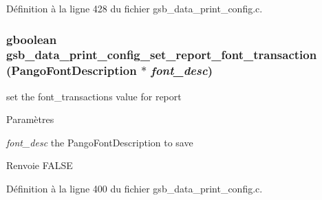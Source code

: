 Définition à la ligne 428 du fichier gsb\_\-data\_\-print\_\-config.c.

\subsubsection[{gsb\_\-data\_\-print\_\-config\_\-set\_\-report\_\-font\_\-transaction}]{\setlength{\rightskip}{0pt plus 5cm}gboolean gsb\_\-data\_\-print\_\-config\_\-set\_\-report\_\-font\_\-transaction (PangoFontDescription $\ast$ {\em font\_\-desc})}\label{gsb__data__print__config_8h_ad01d9f7bfcb5b81d37a5650b41ce17d9}
set the font\_\-transactions value for report


\begin{DoxyParams}{Paramètres}
\item[{\em font\_\-desc}]the PangoFontDescription to save\end{DoxyParams}
\begin{DoxyReturn}{Renvoie}
FALSE 
\end{DoxyReturn}


Définition à la ligne 400 du fichier gsb\_\-data\_\-print\_\-config.c.

